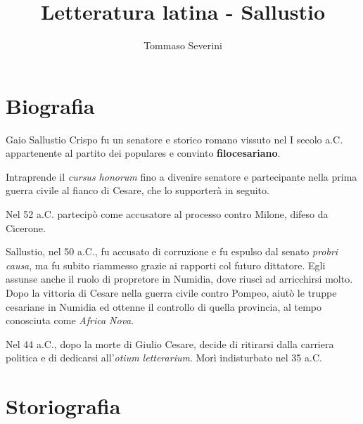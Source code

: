 \documentclass[10pt,a4paper]{article}
\author{Tommaso Severini}
\title{Letteratura latina - Sallustio}
\begin{document}
	\maketitle
	
	\section*{Biografia}
	
	Gaio Sallustio Crispo fu un senatore e storico romano vissuto nel I secolo a.C. appartenente al partito dei populares e convinto \textbf{filocesariano}.
	
	Intraprende il \textit{cursus honorum} fino a divenire senatore e partecipante nella prima guerra civile al fianco di Cesare, che lo supporterà in seguito.
	
	Nel 52 a.C. partecipò come accusatore al processo contro Milone, difeso da Cicerone.
	
	Sallustio, nel 50 a.C., fu accusato di corruzione e fu espulso dal senato \textit{probri causa}, ma fu subito riammesso grazie ai rapporti col futuro dittatore. Egli assunse anche il ruolo di propretore in Numidia, dove riuscì ad arricchirsi molto. Dopo la vittoria di Cesare nella guerra civile contro Pompeo, aiutò le truppe cesariane in Numidia ed ottenne il controllo di quella provincia, al tempo conosciuta come \textit{Africa Nova}.
	
	Nel 44 a.C., dopo la morte di Giulio Cesare, decide di ritirarsi dalla carriera politica e di dedicarsi all'\textit{otium letterarium}. Morì indisturbato nel 35 a.C. 
	
	\section*{Storiografia}
	
	
	
\end{document}
